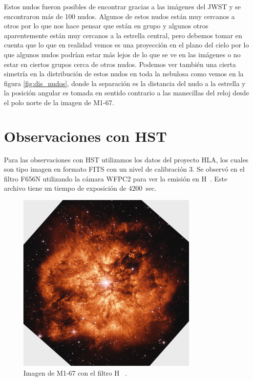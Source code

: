\documentclass{book}
\begin{document}
Estos nudos fueron posibles de encontrar gracias a las imágenes del JWST y se encontraron más de 100 nudos. Algunos de estos nudos están muy cercanos a otros por lo que nos hace pensar que están en grupo y algunos otros aparentemente están muy cercanos a la estrella central, pero debemos tomar en cuenta que lo que en realidad vemos es una proyección en el plano del cielo por lo que algunos nudos podrían estar más lejos de lo que se ve en las imágenes o no estar en ciertos grupos cerca de otros nudos. Podemos ver también una cierta simetría en la distribución de estos nudos en toda la nebulosa como vemos en la figura \ref{fig:dis_nudos}, donde la separación es la distancia del nudo a la estrella y la posición angular es tomada en sentido contrario a las manecillas del reloj desde el polo norte de la imagen de M1-67.

\section{Observaciones con HST}

Para las observaciones con HST utilizamos los datos del proyecto HLA, los cuales son tipo imagen en formato FITS con un nivel de calibración 3.  Se observó en el filtro F656N utilizando la cámara WFPC2 para ver la emisión en \unit{H\alpha}. Este archivo tiene un tiempo de exposición de \SI{4200}{sec}.  

\begin{figure}[h]
    \centering
    \includegraphics[width=0.8\textwidth]{m1-67-comp-full-hst.jpg}
    \caption{Imagen de M1-67 con el filtro \unit{H\alpha} .}
    \label{fig:M1-67HST}
\end{figure}
\end{document}
